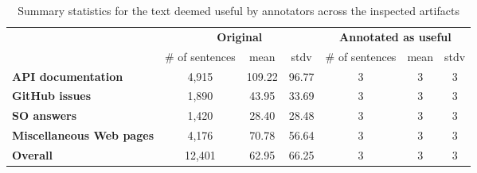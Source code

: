 \begin{table} %
\centering    
\begin{scriptsize}
\begin{threeparttable}
\begin{tabular}{lcccccc}

\hline

& \multicolumn{3}{c}{\textbf{Original}}
& \multicolumn{3}{c}{\textbf{Annotated as useful}}
\\ \cmidrule(l){2-4} \cmidrule(l){5-7}

& \# of sentences & mean & stdv &  \# of sentences & mean & stdv \\

\hline
\hline

\textbf{API documentation} 
& 4,915 & 109.22 & 96.77 & 3 & 3 & 3
\\
\textbf{GitHub issues} 
& 1,890 &  43.95 & 33.69 &  3 & 3 & 3
\\
\textbf{SO answers} 
& 1,420 & 28.40 & 28.48 & 3 &  3 & 3
\\
\textbf{Miscellaneous Web pages} 
& 4,176 & 70.78 & 56.64 
& 3 & 3 & 3
\\

\hline
\hline
\textbf{Overall} 
& 12,401 & 62.95 & 66.25 
& 3 & 3 & 3
\\
\hline

\end{tabular}
\end{threeparttable}
\end{scriptsize}
\caption{Summary statistics for the text deemed useful by annotators across the inspected artifacts}
\label{tbl:corpus-annotation-summary}
\end{table}

